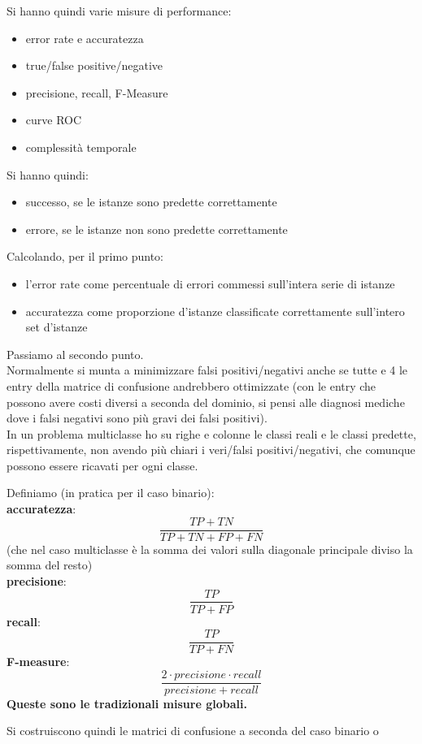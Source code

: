 Si hanno quindi varie misure di performance:
\begin{itemize}
  \item error rate e accuratezza
  \item true/false positive/negative
  \item precisione, recall, F-Measure
  \item curve ROC
  \item complessità temporale
\end{itemize}
Si hanno quindi:
\begin{itemize}
  \item successo, se le istanze sono predette correttamente
  \item errore, se le istanze non sono predette correttamente
\end{itemize}
Calcolando, per il primo punto:
\begin{itemize}
  \item l'error rate come percentuale di errori commessi sull'intera serie di
  istanze 
  \item accuratezza come proporzione d'istanze classificate correttamente
  sull'intero set d'istanze 
\end{itemize}
Passiamo al secondo punto.\\
Normalmente si munta a minimizzare falsi positivi/negativi anche se tutte e 4 le
entry della matrice di confusione andrebbero ottimizzate (con le entry che
possono avere costi 
diversi a seconda del dominio, si pensi alle diagnosi mediche dove i falsi
negativi sono più gravi dei falsi positivi).\\
In un problema multiclasse ho su righe e colonne le classi reali e le classi
predette, rispettivamente, non avendo più chiari i veri/falsi positivi/negativi,
che comunque possono essere ricavati per ogni classe.\\
\begin{definizione}
  Definiamo (in pratica per il caso binario):\\
  \textbf{accuratezza}:
  \[\frac{TP+TN}{TP+TN+FP+FN}\]
  (che nel caso multiclasse è la somma dei valori sulla diagonale principale
  diviso la somma del resto)\\
  \textbf{precisione}:
  \[\frac{TP}{TP+FP}\]
  \textbf{recall}:
  \[\frac{TP}{TP+FN}\]
  \textbf{F-measure}:
  \[\frac{2\cdot precisione\cdot recall}{precisione+ recall}\]
  \textbf{Queste sono le tradizionali misure globali.}
\end{definizione}
Si costruiscono quindi le matrici di confusione a seconda del caso binario o
